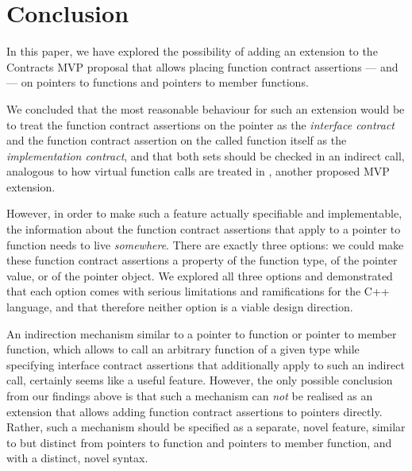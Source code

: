 
\section{Conclusion}

In this paper, we have explored the possibility of adding an extension to the Contracts MVP proposal \cite{P2900R7} that allows placing function contract assertions ---  and  --- on pointers to functions and pointers to member functions.

We concluded that the most reasonable behaviour for such an extension would be to treat the function contract assertions on the pointer as the \emph{interface contract} and the function contract assertion on the called function itself as the \emph{implementation contract}, and that both sets should be checked in an indirect call, analogous to how virtual function calls are treated in \cite{P3097R0}, another proposed MVP extension.

However, in order to make such a feature actually specifiable and implementable, the information about the function contract assertions that apply to a pointer to function needs to live \emph{somewhere}. There are exactly three options: we could make these function contract assertions a property of the function type, of the pointer value, or of the pointer object. We explored all three options and demonstrated that each option comes with serious limitations and ramifications for the C++ language, and that therefore neither option is a viable design direction.


An indirection mechanism similar to a pointer to function or pointer to member function, which allows to call an arbitrary function of a given type while specifying interface contract assertions that additionally apply to such an indirect call, certainly seems like a useful feature. However, the only possible conclusion from our findings above is that such a mechanism can \emph{not} be realised as an extension that allows adding function contract assertions to pointers directly. Rather, such a mechanism should be specified as a separate, novel feature, similar to but distinct from pointers to function and pointers to member function, and with a distinct, novel syntax.

